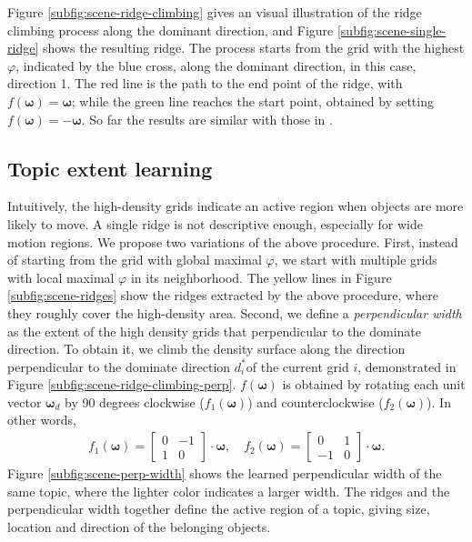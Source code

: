     Figure \ref{subfig:scene-ridge-climbing} gives an visual illustration of the ridge climbing process along the dominant direction, and Figure \ref{subfig:scene-single-ridge} shows the resulting ridge. The process starts from the grid with the highest $\varphi$, indicated by the blue cross, along the dominant direction, in this case, direction 1. 
    The red line is the path to the end point of the ridge, with $f(\bm{\omega}) = \bm{\omega}$; while the green line reaches the start point, obtained by setting $f(\bm{\omega}) = -\bm{\omega}$. So far the results are similar with those in \cite{zhao2013counting}.

    

\subsection{Topic extent learning}
    Intuitively, the high-density grids indicate an active region when objects are more likely to move.
    A single ridge is not descriptive enough, especially for wide motion regions. 
    We propose two variations of the above procedure.
    First, instead of starting from the grid with global maximal $\varphi$, we start with multiple grids with local maximal $\varphi$ in its neighborhood. 
    The yellow lines in Figure \ref{subfig:scene-ridges} show the ridges extracted by the above procedure, where they roughly cover the high-density area. 
    Second, we define a \emph{perpendicular width} as the extent of the high density grids that perpendicular to the dominate direction. To obtain it, we climb the density surface along the direction perpendicular to the dominate direction $d^*_i$of the current grid $i$, demonstrated in Figure \ref{subfig:scene-ridge-climbing-perp}.
    $f(\bm{\omega})$ is obtained by rotating each unit vector $\bm{\omega}_{d}$ by 90 degrees clockwise ($f_1(\bm{\omega})$) and counterclockwise ($f_2(\bm{\omega})$). In other words, 
    \begin{align*}
        f_1(\bm{\omega}) = \left[\begin{array}{cc} 0 & -1\\ 1 & 0\end{array}\right]\cdot\bm{\omega},\quad
        f_2(\bm{\omega}) = \left[\begin{array}{cc} 0 & 1\\ -1 & 0\end{array}\right]\cdot\bm{\omega}.
    \end{align*}
    Figure \ref{subfig:scene-perp-width} shows the learned perpendicular width of the same topic, where the lighter color indicates a larger width. The ridges and the perpendicular width together define the active region of a topic, giving size, location and direction of the belonging objects.


